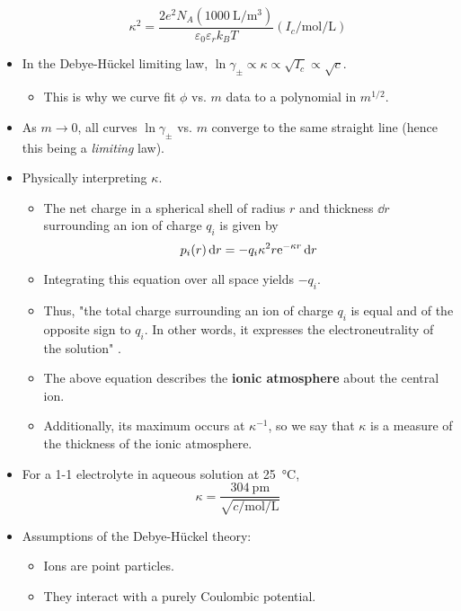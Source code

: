 \documentclass[../notes.tex]{subfiles}
\begin{document}
\begin{itemize}
\begin{equation*}
        \kappa^2 = \frac{2e^2N_A(\SI{1000}{\liter\per\cubic\meter})}{\varepsilon_0\varepsilon_rk_BT}(I_c/\si{\mole\per\liter})
    \end{equation*}
    \item In the Debye-H\"{u}ckel limiting law, $\ln\gamma_\pm\propto\kappa\propto\sqrt{I_c}\propto\sqrt{c}$.
    \begin{itemize}
        \item This is why we curve fit $\phi$ vs. $m$ data to a polynomial in $m^{1/2}$.
    \end{itemize}
    \item As $m\to 0$, all curves $\ln\gamma_\pm$ vs. $m$ converge to the same straight line (hence this being a \emph{limiting} law).
    \item Physically interpreting $\kappa$.
    \begin{itemize}
        \item The net charge in a spherical shell of radius $r$ and thickness $\dd{r}$ surrounding an ion of charge $q_i$ is given by
        \begin{equation*}
            p_i(r)\dd{r} = -q_i\kappa^2r\e[-\kappa r]\dd{r}
        \end{equation*}
        \item Integrating this equation over all space yields $-q_i$.
        \item Thus, "the total charge surrounding an ion of charge $q_i$ is equal and of the opposite sign to $q_i$. In other words, it expresses the electroneutrality of the solution" \parencite[1033-34]{bib:McQuarrieSimon}.
        \item The above equation describes the \textbf{ionic atmosphere} about the central ion.
        \item Additionally, its maximum occurs at $\kappa^{-1}$, so we say that $\kappa$ is a measure of the thickness of the ionic atmosphere.
    \end{itemize}
    \item For a 1-1 electrolyte in aqueous solution at \SI{25}{\celsius},
    \begin{equation*}
        \kappa = \frac{\SI{304}{\pico\meter}}{\sqrt{c/\si{\mole\per\liter}}}
    \end{equation*}
    \item Assumptions of the Debye-H\"{u}ckel theory:
    \begin{itemize}
        \item Ions are point particles.
        \item They interact with a purely Coulombic potential.

\end{itemize}
\end{itemize}
\end{document}
